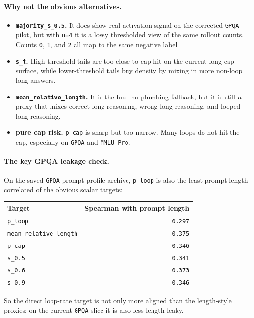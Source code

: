 \documentclass[11pt]{article}
\begin{document}
\paragraph{Why not the obvious alternatives.}
\begin{itemize}[leftmargin=1.5em]
\item \textbf{\texttt{majority\_s\_0.5}.} It does show real activation signal on the
  corrected \texttt{GPQA} pilot, but with \texttt{n=4} it is a lossy thresholded
  view of the same rollout counts. Counts \texttt{0}, \texttt{1}, and
  \texttt{2} all map to the same negative label.
\item \textbf{\texttt{s\_t}.} High-threshold tails are too close to cap-hit on the
  current long-cap surface, while lower-threshold tails buy density by mixing in
  more non-loop long answers.
\item \textbf{\texttt{mean\_relative\_length}.} It is the best no-plumbing fallback,
  but it is still a proxy that mixes correct long reasoning, wrong long reasoning,
  and looped long reasoning.
\item \textbf{pure cap risk.} \texttt{p\_cap} is sharp but too narrow. Many loops do
  not hit the cap, especially on \texttt{GPQA} and \texttt{MMLU-Pro}.
\end{itemize}

\paragraph{The key GPQA leakage check.}
On the saved \texttt{GPQA} prompt-profile archive, \texttt{p\_loop} is also the
least prompt-length-correlated of the obvious scalar targets:
\begin{center}
\begin{tabular}{lr}
\toprule
Target & Spearman with prompt length \\
\midrule
\texttt{p\_loop} & \texttt{0.297} \\
\texttt{mean\_relative\_length} & \texttt{0.375} \\
\texttt{p\_cap} & \texttt{0.346} \\
\texttt{s\_0.5} & \texttt{0.341} \\
\texttt{s\_0.6} & \texttt{0.373} \\
\texttt{s\_0.9} & \texttt{0.346} \\
\bottomrule
\end{tabular}
\end{center}
So the direct loop-rate target is not only more aligned than the length-style
proxies; on the current \texttt{GPQA} slice it is also less length-leaky.
\end{document}
